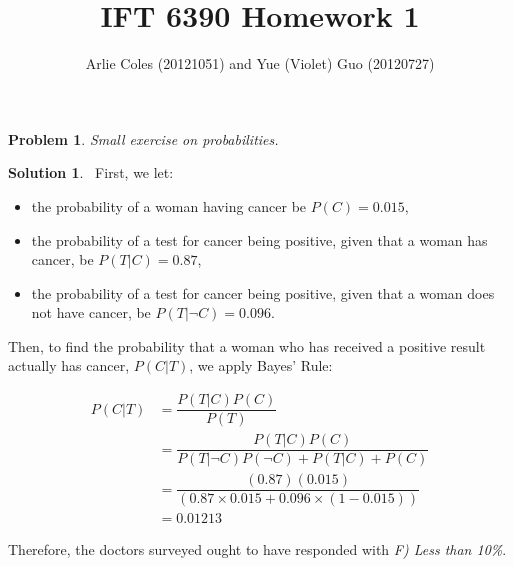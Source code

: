 \documentclass[letterpaper, 12pt]{article}
\newtheorem{problem}{Problem}
\theoremstyle{definition}
\newtheorem*{solution}{Solution}
\begin{document}
 

\def\lc{\left\lceil}   
\def\rc{\right\rceil}
\def\lf{\left\lfloor}
\def\rf{\right\rfloor}


 
 
\title{IFT 6390 Homework 1}
\author{Arlie Coles (20121051) and Yue (Violet) Guo (20120727)}
\maketitle

\begin{problem}
Small exercise on probabilities.
\end{problem}

\begin{solution}\
	First, we let:
	\begin{itemize}
    	\item the probability of a woman having cancer be $P(C) = 0.015$,
    	\item the probability of a test for cancer being positive, given that a woman has cancer, be $P(T|C) = 0.87$,
        \item the probability of a test for cancer being positive, given that a woman does not have cancer, be $P(T|\neg C) = 0.096$.
     \end{itemize}
     
     Then, to find the probability that a woman who has received a positive result actually has cancer, $P(C|T)$, we apply Bayes' Rule:

     \begin{equation*}
     	\begin{split}
     		P(C|T) & = \dfrac{P(T|C)P(C)}{P(T)}\\
            &= \dfrac{P(T|C)P(C)}{P(T|\neg C)P(\neg C) + P(T | C) + P(C) }\\
     		& = \dfrac{(0.87)(0.015)}{(0.87 \times 0.015 +0.096 \times (1- 0.015))}\\
            & = 0.01213
        \end{split}
     \end{equation*}

     Therefore, the doctors surveyed ought to have responded with \textit{F) Less than 10\%}.
     
\end{solution}\
\end{document}
